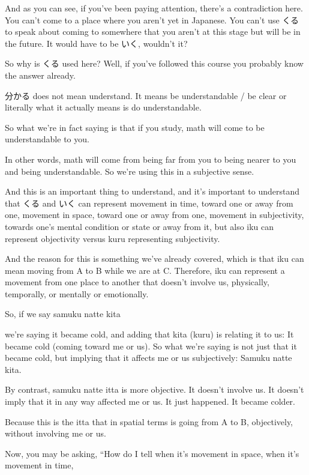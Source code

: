And as you can see, if you've been paying attention, there's a contradiction here. You can't come to a place where you aren't yet in Japanese. You can't use くる to speak about coming to somewhere that you aren't at this stage but will be in the future. It would have to be いく, wouldn't it?

So why is くる used here? Well, if you've followed this course you probably know the answer already.

分かる does not mean understand. It means be understandable / be clear or literally what it actually means is do understandable.

So what we're in fact saying is that if you study, math will come to be understandable to you.

{}

In other words, math will come from being far from you to being nearer to you and being understandable. So we're using this in a subjective sense.

And this is an important thing to understand, and it's important to understand that くる and いく can represent movement in time, toward one or away from one, movement in space, toward one or away from one, movement in subjectivity, towards one's mental condition or state or away from it, but also iku can represent objectivity versus kuru representing subjectivity.

And the reason for this is something we've already covered, which is that iku can mean moving from A to B while we are at C. Therefore, iku can represent a movement from one place to another that doesn't involve us, physically, temporally, or mentally or emotionally.

So, if we say samuku natte kita {}

we're saying it became cold, and adding that kita (kuru) is relating it to us: It became cold (coming toward me or us). So what we're saying is not just that it became cold, but implying that it affects me or us subjectively: Samuku natte kita.

By contrast, samuku natte itta is more objective. It doesn't involve us. It doesn't imply that it in any way affected me or us. It just happened. It became colder.

Because this is the itta that in spatial terms is going from A to B, objectively, without involving me or us.

Now, you may be asking, “How do I tell when it's movement in space, when it's movement in time, {}

